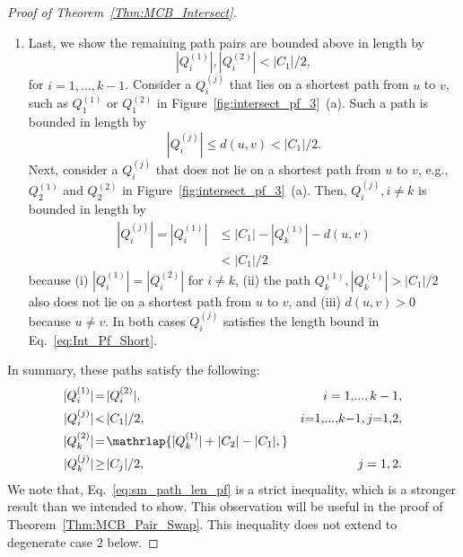 \documentclass[fleqn,11pt]{article}
\begin{document}
\begin{proof}[Proof of Theorem~\ref{Thm:MCB_Intersect}]
\begin{enumerate}
		\item Last, we show the remaining path pairs are bounded above in length by
		\begin{equation}
			|Q_i^{(1)}|,|Q_i^{(2)}|<|C_1|/2, 
			\label{eq:Int_Pf_Short}
		\end{equation}
		for  $i=1,\hdots,k-1$. 
		Consider a $Q_i^{(j)}$ that lies on a shortest path from $u$ to $v$, such as $Q_1^{(1)}$ or $Q_1^{(2)}$ in Figure~\ref{fig:intersect_pf_3}~(a). Such a path is bounded in length by
		\begin{equation*}
			|Q_i^{(j)}|\le d(u,v) < |C_1|/2.
		\end{equation*}
		Next, consider a $Q_i^{(j)}$ that does not lie on a shortest path from $u$ to $v$, e.g., $Q_2^{(1)}$ and $Q_2^{(2)}$ in Figure~\ref{fig:intersect_pf_3}~(a). Then, $Q_i^{(j)}, i\neq k$ is bounded in length by
		\begin{equation*}
			\begin{split}
			|Q_i^{(j)}| = |Q_i^{(1)}| &\le |C_1| - |Q_k^{(1)}|-d(u,v) \\&< |C_1|/2
			\end{split}
		\end{equation*}
		because (i) $|Q_i^{(1)}|=|Q_i^{(2)}|$ for $i\neq k$, (ii) the path $Q_k^{(1)},|Q_k^{(1)}|>|C_1|/2$ also does not lie on a shortest path from $u$ to $v$, and (iii) $d(u,v)>0$ because $u\neq v$.
		In both cases $Q_i^{(j)}$ satisfies the length bound in Eq.~\eqref{eq:Int_Pf_Short}.
	\end{enumerate}
	
	In summary, these paths satisfy the following:
	\begin{align}
		|Q^{(1)}_i| &\!=\! |Q^{(2)}_i|, &i=1,\!...,k-1,
		\label{eq:sm_path_equal_pf}\\
		|Q^{(j)}_i| &\!<\! |C_1|/2,\! &i{=}1,\!...,\!k{-}1, j{=}1,\!2,
		\label{eq:sm_path_len_pf}\\
		|Q^{(2)}_k| &\!=\! \mathrlap{|Q^{(1)}_k|+|C_2|-|C_1|,}
		\label{eq:lg_path_equal_pf}\\
		|Q^{(j)}_k| &\!\ge\! |C_j|/2,\! &j=1,2.
		\label{eq:lg_path_len_pf}
	\end{align}
	We note that, Eq.~\eqref{eq:sm_path_len_pf} is a strict inequality, which is a stronger result than we intended to show. 
	This observation will be useful in the proof of Theorem~\ref{Thm:MCB_Pair_Swap}. 
	This inequality does not extend to degenerate case 2 below.
	

\end{proof}
\end{document}
